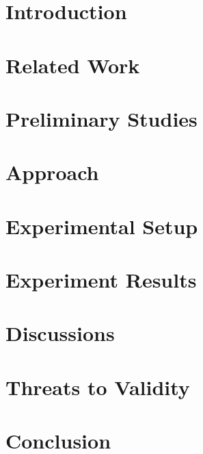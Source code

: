 \mainmatter
\chapter{Introduction}
\thispagestyle{fancy}
\bigskip


\clearpage
\chapter{Related Work}
\thispagestyle{fancy}
\bigskip


\clearpage
\chapter{Preliminary Studies}
\thispagestyle{fancy}
\bigskip


\clearpage
\chapter{Approach}
\thispagestyle{fancy}
\bigskip


\clearpage
\chapter{Experimental Setup}
\thispagestyle{fancy}
\bigskip


\clearpage
\chapter{Experiment Results}
\thispagestyle{fancy}
\bigskip


\clearpage
\chapter{Discussions}
\thispagestyle{fancy}
\bigskip


\clearpage
\chapter{Threats to Validity}
\thispagestyle{fancy}
\bigskip


\clearpage
\chapter{Conclusion}
\thispagestyle{fancy}
\bigskip


